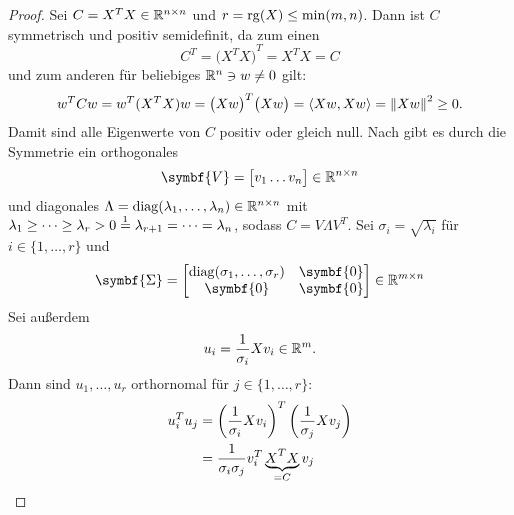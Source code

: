 \begin{proof}
    Sei \(C = X^{T}X \in \mathbb{R}^{n \times n}\) und \(r = \operatorname{rg}(X) \leq \min(m,n)\).
    Dann ist \(C\) symmetrisch und positiv semidefinit, da zum einen 
    \begin{equation*}
        C^{T} = {\big(X^{T}X\big)}^{T} = X^{T}X = C
    \end{equation*}  
    und zum anderen für beliebiges \(\mathbb{R}^{n} \ni w \neq 0\) gilt:
    \begin{equation*}
        w^{T}Cw = w^{T}(X^{T}X)w = {\big(Xw\big)}^{T}\big(Xw\big) = \langle Xw,Xw \rangle = {\lVert Xw\rVert}^{2} \geq 0.
    \end{equation*}
    Damit sind alle Eigenwerte von \(C\) positiv oder gleich null. 
    Nach  gibt es durch die Symmetrie ein orthogonales 
    \begin{equation*}
        \symbf{V} =
        \big[
        \begin{matrix}
            v_1 \dots v_n
        \end{matrix}
        \big]
        \in \R^{n \times n}
    \end{equation*}
    und diagonales \(\Lambda = \operatorname{diag}(\lambda_1,\ldots,\lambda_n) \in \mathbb{R}^{n \times n}\) mit \(\lambda_1 \geq \cdots \geq \lambda_r > 0 \oset[.45ex]{\footnotemark}{=} \lambda_{r+1} = \cdots = \lambda_n\), sodass \(C = V \Lambda V^{T}\).    
    Sei \(\sigma_i = \sqrt{\lambda_i}\) für \(i \in \{1,\ldots,r\}\) und
    \begin{equation*}
        \symbf{\Sigma} = 
        \begin{bmatrix}
            \diag(\sigma_1,\ldots,\sigma_r) & \symbf{0} \\
            \symbf{0} & \symbf{0}
        \end{bmatrix}
        \in \R^{m \times n}
    \end{equation*}
    Sei außerdem
    \begin{equation*}
        u_i = \frac{1}{\sigma_i}Xv_i \in \mathbb{R}^{m}.
    \end{equation*}
    Dann sind \(u_1,\ldots,u_r\) orthornomal für \(j \in \{1,\ldots,r\}\):
    \begin{align*}
        u_i^{T}u_j &= {\left(\frac{1}{\sigma_i}Xv_i\right)}^{T}\left(\frac{1}{\sigma_j}Xv_j\right) \\
        &= \frac{1}{\sigma_i \sigma_j}v_i^{T}\underbrace{X^{\raisebox{0.2ex}{\(\scriptstyle{T}\)}}X}_{=C}v_j \\

\end{align*}
\end{proof}
